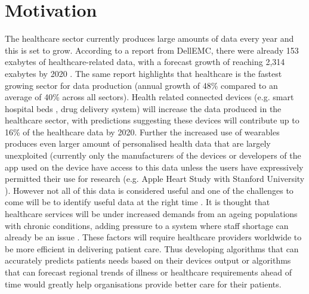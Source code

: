 \section{Motivation}
The healthcare sector currently produces large amounts of data every year and this is set to grow.  According to a report from DellEMC, there were already 153 exabytes of healthcare-related data, with a forecast growth of reaching 2,314 exabytes by 2020 \citep{EMC:2014ve}. The same report highlights that healthcare is the fastest growing sector for data production (annual growth of 48\% compared to an average of 40\% across all sectors).  Health related connected devices (e.g. smart hospital beds , drug delivery system) will increase the data produced in the healthcare sector, with predictions suggesting these devices will contribute up to 16\% of the healthcare data by 2020.\newline
Further the increased use of wearables produces even larger amount of personalised health data that are largely unexploited (currently only the manufacturers of the devices or developers of the app used on the device have access to this data unless the users have expressively permitted their use for research (e.g. Apple Heart Study with Stanford University \citep{Anonymous:I2FTN6O4, Medicine:2017wa}). However not all of this data is considered useful and one of the challenges to come will be to identify useful data at the right time \citep{EMC:2014ve}.\newline
It is thought that healthcare services will be under increased demands from an ageing populations with chronic conditions, adding pressure to a system where staff shortage can already be an issue \citep{Medicine:2017wa}. These factors will require healthcare providers worldwide to be more efficient in delivering patient care. Thus developing algorithms that can accurately predicts patients needs based on their devices output or algorithms that can forecast regional trends of illness or healthcare requirements ahead of time would greatly help organisations provide better care for their patients. \newline

